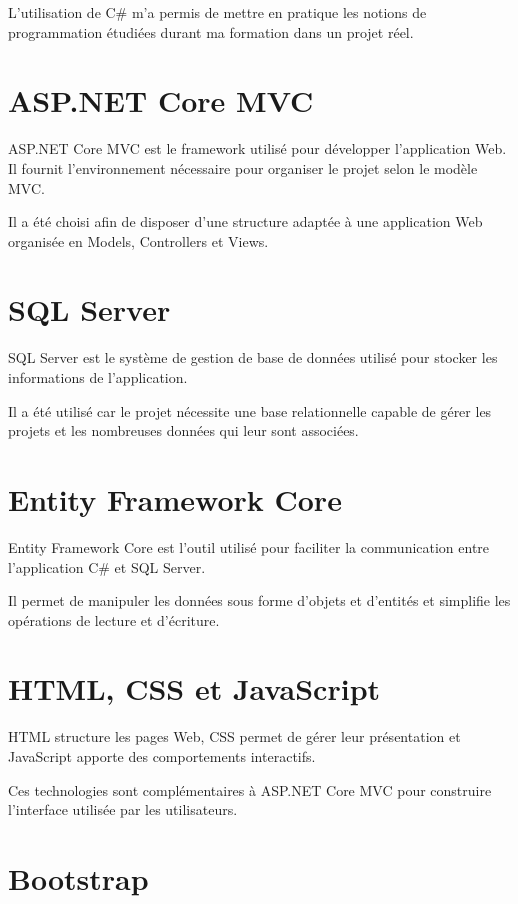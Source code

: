 \documentclass[12pt,a4paper,oneside]{report}
\begin{document}
L'utilisation de C\# m'a permis de mettre en pratique les notions de programmation étudiées durant ma formation dans un projet réel.

\section{ASP.NET Core MVC}

ASP.NET Core MVC est le framework utilisé pour développer l'application Web. Il fournit l'environnement nécessaire pour organiser le projet selon le modèle MVC.

Il a été choisi afin de disposer d'une structure adaptée à une application Web organisée en Models, Controllers et Views.

\section{SQL Server}

SQL Server est le système de gestion de base de données utilisé pour stocker les informations de l'application.

Il a été utilisé car le projet nécessite une base relationnelle capable de gérer les projets et les nombreuses données qui leur sont associées.

\section{Entity Framework Core}

Entity Framework Core est l'outil utilisé pour faciliter la communication entre l'application C\# et SQL Server.

Il permet de manipuler les données sous forme d'objets et d'entités et simplifie les opérations de lecture et d'écriture.

\section{HTML, CSS et JavaScript}

HTML structure les pages Web, CSS permet de gérer leur présentation et JavaScript apporte des comportements interactifs.

Ces technologies sont complémentaires à ASP.NET Core MVC pour construire l'interface utilisée par les utilisateurs.

\section{Bootstrap}
\end{document}
